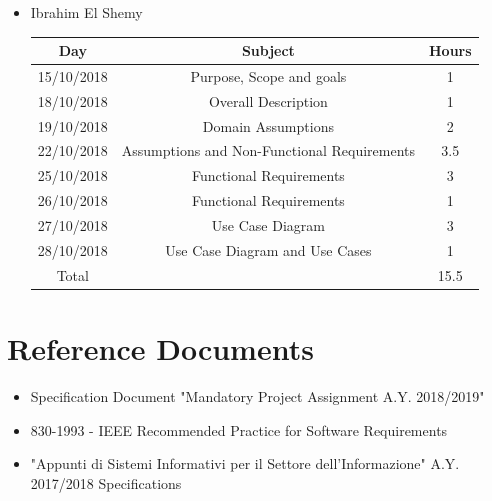 \documentclass[12pt,a4paper]{article}
\begin{document}
\begin{itemize}
		\item Ibrahim El Shemy
		\begin{center}
			\begin{tabular}{| c | c | c |}
				\hline
				Day & Subject & Hours \\ \hline
				15/10/2018 & Purpose, Scope and goals & 1 \\
				18/10/2018 & Overall Description & 1 \\
				19/10/2018  & Domain Assumptions & 2 \\
				22/10/2018  & Assumptions and Non-Functional Requirements & 3.5 \\
				25/10/2018 & Functional Requirements & 3 \\
				26/10/2018 & Functional Requirements & 1 \\
				27/10/2018 & Use Case Diagram & 3 \\
				28/10/2018 & Use Case Diagram and Use Cases & 1 \\
				\hline
				Total & & 15.5 \\
				\hline
			\end{tabular}
		\end{center}
	\end{itemize}
	\section{Reference Documents}
	\begin{itemize}
		\item Specification Document "Mandatory Project Assignment A.Y. 2018/2019"
		\item 830-1993 - IEEE Recommended Practice for Software Requirements
		\item "Appunti di Sistemi Informativi per il Settore dell'Informazione" A.Y. 2017/2018
		Specifications
	\end{itemize}
\end{document}
